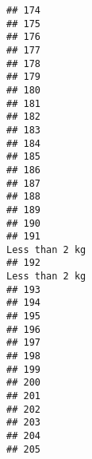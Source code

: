 \documentclass[
]{article}
\begin{document}
\begin{verbatim}
## 174                                                                            
## 175                                                                            
## 176                                                                            
## 177                                                                            
## 178                                                                            
## 179                                                                            
## 180                                                                            
## 181                                                                            
## 182                                                                            
## 183                                                                            
## 184                                                                            
## 185                                                                            
## 186                                                                            
## 187                                                                            
## 188                                                                            
## 189                                                                            
## 190                                                                            
## 191                                                              Less than 2 kg
## 192                                                              Less than 2 kg
## 193                                                                            
## 194                                                                            
## 195                                                                            
## 196                                                                            
## 197                                                                            
## 198                                                                            
## 199                                                                            
## 200                                                                            
## 201                                                                            
## 202                                                                            
## 203                                                                            
## 204                                                                            
## 205                                                                            

\end{verbatim}
\end{document}
